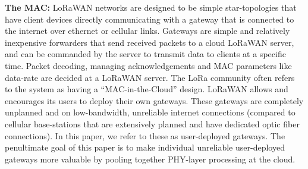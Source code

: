 \vspace*{0.02in}

\noindent \textbf{The MAC: } LoRaWAN networks are designed to be simple
star-topologies that have client devices directly communicating with a gateway
that is connected to the internet over ethernet or cellular links. Gateways
are simple and relatively inexpensive forwarders that send received packets to
a cloud LoRaWAN server, and can be commanded by the server to transmit data to
clients at a specific time. Packet decoding, managing acknowledgements and MAC
parameters like data-rate are decided at a LoRaWAN server. The LoRa community
often refers to the system as having a ``MAC-in-the-Cloud'' design. LoRaWAN
allows and encourages its users to deploy their own gateways. These gateways
are completely unplanned and on low-bandwidth, unreliable internet connections
(compared to cellular base-stations that are extensively planned and have
dedicated optic fiber connections). In this paper, we refer to these as
user-deployed gateways. The penultimate goal of this paper is to make
individual unreliable user-deployed gateways more valuable by pooling together
PHY-layer processing at the cloud.
